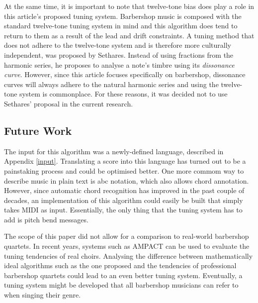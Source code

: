 \documentclass[a4paper]{article}
\begin{document}
At the same time, it is important to note that twelve-tone bias does play a role in this article's proposed tuning system. Barbershop music is composed with the standard twelve-tone tuning system in mind and this algorithm does tend to return to them as a result of the lead and drift constraints. A tuning method that does not adhere to the twelve-tone system and is therefore more culturally independent, was proposed by Sethares. Instead of using fractions from the harmonic series, he proposes to analyse a note's timbre using its \textit{dissonance curve}.\cite{sethares_adaptive_1994} However, since this article focuses specifically on barbershop, dissonance curves will always adhere to the natural harmonic series and using the twelve-tone system is commonplace. For these reasons, it was decided not to use Sethares' proposal in the current research.

\subsection{Future Work}
The input for this algorithm was a newly-defined language, described in Appendix \ref{input}. Translating a score into this language has turned out to be a painstaking process and could be optimised better. One more commom way to describe music in plain text is abc notation, which also allows chord annotation.\cite{walshaw_abc2mtex_1997} However, since automatic chord recognition has improved in the past couple of decades\cite{burgoyne_cross-validated_2007}, an implementation of this algorithm could easily be built that simply takes MIDI as input. Essentially, the only thing that the tuning system has to add is pitch bend messages.

The scope of this paper did not allow for a comparison to real-world barbershop quartets. In recent years, systems such as AMPACT can be used to evaluate the tuning tendencies of real choirs.\cite{devaney_study_2012} Analysing the difference between mathematically ideal algorithms such as the one proposed and the tendencies of professional barbershop quartets could lead to an even better tuning system. Eventually, a tuning system might be developed that all barbershop musicians can refer to when singing their genre.


\end{document}
